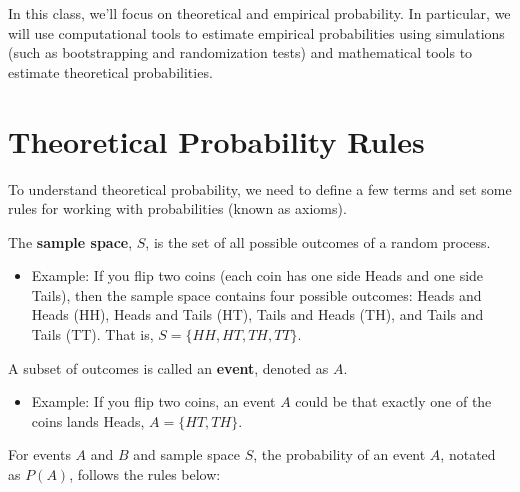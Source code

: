 \documentclass[
]{book}
\providecommand{\tightlist}{%
  \setlength{\itemsep}{0pt}\setlength{\parskip}{0pt}}
\begin{document}
In this class, we'll focus on theoretical and empirical probability. In particular, we will use computational tools to estimate empirical probabilities using simulations (such as bootstrapping and randomization tests) and mathematical tools to estimate theoretical probabilities.

\section{Theoretical Probability Rules}\label{theoretical-probability-rules}

To understand theoretical probability, we need to define a few terms and set some rules for working with probabilities (known as axioms).

The \textbf{sample space}, \(S\), is the set of all possible outcomes of a random process.

\begin{itemize}
\tightlist
\item
  Example: If you flip two coins (each coin has one side Heads and one side Tails), then the sample space contains four possible outcomes: Heads and Heads (HH), Heads and Tails (HT), Tails and Heads (TH), and Tails and Tails (TT). That is, \(S = \{HH,HT,TH,TT\}\).
\end{itemize}

A subset of outcomes is called an \textbf{event}, denoted as \(A\).

\begin{itemize}
\tightlist
\item
  Example: If you flip two coins, an event \(A\) could be that exactly one of the coins lands Heads, \(A = \{HT,TH\}\).
\end{itemize}

For events \(A\) and \(B\) and sample space \(S\), the probability of an event \(A\), notated as \(P(A)\), follows the rules below:
\end{document}
